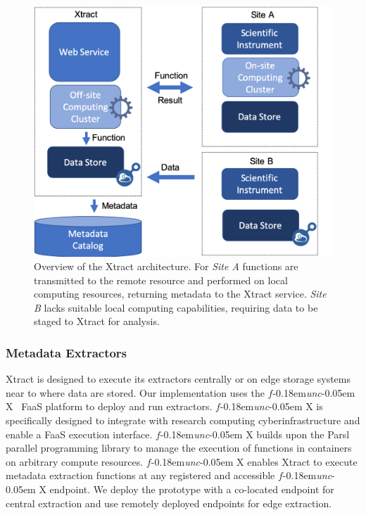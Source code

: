 \documentclass[sigconf]{acmart}
\newcommand{\name}{Xtract}
\newcommand{\funcx}{$f$\kern-0.18em\emph{unc}\kern-0.05em X}
\begin{document}
\begin{figure}[t]
	\centering
	\includegraphics[scale=0.45]{figs/new-arch.png}
	\caption{Overview of the \name{} architecture. For \textit{Site A} functions are transmitted to the remote resource and performed on local computing resources, returning metadata to the \name{} service. \textit{Site B} lacks suitable local
	computing capabilities, requiring data to be staged to \name{} for analysis.}
	\label{fig:arch}
\end{figure}

\subsubsection{Metadata Extractors}
\name{} is designed to execute its extractors centrally or on edge storage systems near to where
data are stored. 
Our implementation uses the \funcx~\cite{chard2019serverless} FaaS platform 
to deploy and run extractors. 
\funcx{} is specifically designed to integrate with research computing 
cyberinfrastructure and enable a FaaS execution interface. 
\funcx{} builds upon the Parsl~\cite{babuji2019parsl} parallel programming library to 
manage the execution of functions in containers on arbitrary compute resources. 
\funcx{} enables \name{} to execute metadata extraction functions at any registered 
and accessible \funcx{} endpoint. 
We deploy the prototype with a co-located endpoint for central extraction
and use remotely deployed endpoints for edge extraction.
\end{document}
